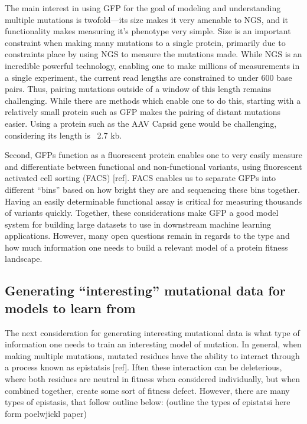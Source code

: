 The main interest in using GFP for the goal of modeling and understanding multiple mutations is twofold---its size makes it very amenable to NGS, and it functionality makes measuring it’s phenotype very simple. Size is an important constraint when making many mutations to a single protein, primarily due to constraints place by using NGS to measure the mutations made. While NGS is an incredible powerful technology, enabling one to make millions of measurements in a single experiment, the current read lengths are constrained to under 600 base pairs. Thus, pairing mutations outside of a window of this length remains challenging. While there are methods which enable one to do this, starting with a relatively small protein such as GFP makes the pairing of distant mutations easier. Using a protein such as the AAV Capsid gene would be challenging, considering its length is ~2.7 kb.

Second, GFPs function as a fluorescent protein enables one to very easily measure and differentiate between functional and non-functional variants, using fluorescent activated cell sorting (FACS) [ref]. FACS enables us to separate GFPs into different “bins” based on how bright they are and sequencing these bins together. Having an easily determinable functional assay is critical for measuring thousands of variants quickly. Together, these considerations make GFP a good model system for building large datasets to use in downstream machine learning applications. However, many open questions remain in regards to the type and how much information one needs to build a relevant model of a protein fitness landscape. 

\subsection{Generating “interesting” mutational data for models to learn from}

The next consideration for generating interesting mutational data is what type of information one needs to train an interesting model of mutation. In general, when making multiple mutations, mutated residues have the ability to interact through a process known as epistatsis [ref]. Iften these interaction can be deleterious, where both residues are neutral in fitness when considered individually, but when combined together, create some sort of fitness defect. However, there are many types of epistasis, that follow outline below: (outline the types of epistatsi here form poelwjickl paper)

